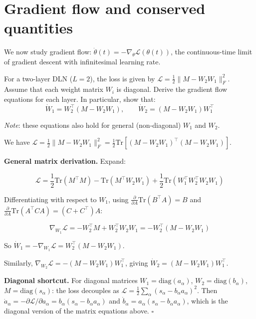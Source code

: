\documentclass[11pt]{article}
\begin{document}
\section{Gradient flow and conserved quantities}
\label{sec:td-gradflow}

We now study gradient flow:
\(\dot{\theta}(t) = -\nabla_\theta \mathcal{L}(\theta(t))\), the
continuous-time limit of gradient descent with infinitesimal learning
rate.

\begin{exercise}
\label{ex:td-2a}
For a two-layer DLN (\(L=2\)), the loss is given by \(\mathcal{L} = \frac{1}{2}\|M - W_2 W_1\|_F^2\).
Assume that each weight matrix \(W_i\) is diagonal.
Derive the gradient flow equations for each layer.
In particular, show that:
\[\dot{W}_1 = W_2^\top(M - W_2 W_1), \qquad \dot{W}_2 = (M - W_2 W_1) W_1^\top\]

\emph{Note}: these equations also hold for general (non-diagonal)
\(W_1\) and \(W_2\).
\end{exercise}

\begin{solution}[ex:td-2a]
We have
\(\mathcal{L} = \frac{1}{2}\|M - W_2 W_1\|_F^2 = \frac{1}{2}\text{Tr}\left[(M - W_2 W_1)^\top(M - W_2 W_1)\right]\).

\textbf{General matrix derivation.} Expand:

\[\mathcal{L} = \frac{1}{2}\text{Tr}(M^\top M) - \text{Tr}(M^\top W_2 W_1) + \frac{1}{2}\text{Tr}(W_1^\top W_2^\top W_2 W_1)\]

Differentiating with respect to \(W_1\), using
\(\frac{\partial}{\partial A}\text{Tr}(B^\top A) = B\) and
\(\frac{\partial}{\partial A}\text{Tr}(A^\top C A) = (C + C^\top)A\):

\[\nabla_{W_1}\mathcal{L} = -W_2^\top M + W_2^\top W_2 W_1 = -W_2^\top(M - W_2 W_1)\]

So \(\dot{W}_1 = -\nabla_{W_1}\mathcal{L} = W_2^\top(M - W_2 W_1)\).

Similarly, \(\nabla_{W_2}\mathcal{L} = -(M - W_2 W_1)W_1^\top\), giving
\(\dot{W}_2 = (M - W_2 W_1)W_1^\top\).

\textbf{Diagonal shortcut.} For diagonal matrices
\(W_1 = \text{diag}(a_\alpha)\), \(W_2 = \text{diag}(b_\alpha)\),
\(M = \text{diag}(s_\alpha)\): the loss decouples as
\(\mathcal{L} = \frac{1}{2}\sum_\alpha(s_\alpha - b_\alpha a_\alpha)^2\).
Then
\(\dot{a}_\alpha = -\partial\mathcal{L}/\partial a_\alpha = b_\alpha(s_\alpha - b_\alpha a_\alpha)\)
and \(\dot{b}_\alpha = a_\alpha(s_\alpha - b_\alpha a_\alpha)\), which
is the diagonal version of the matrix equations above. \(\square\)
\end{solution}
\end{document}
